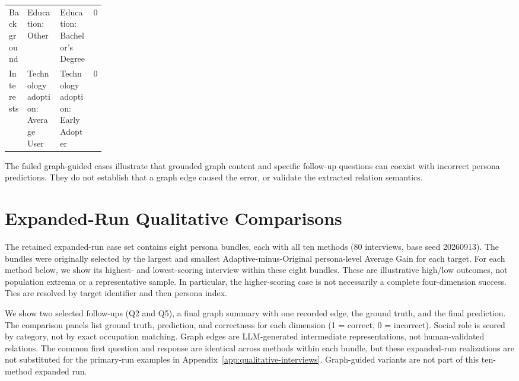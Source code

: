 \documentclass{ieeeaccess}
\begin{document}
\begin{multicols*}{2}
\begin{minipage}{\linewidth}
\begin{tabularx}{\linewidth}{@{}p{0.19\linewidth}>{\raggedright\arraybackslash}X>{\raggedright\arraybackslash}Xr@{}}
Background & Education: Other & Education: Bachelor's Degree & 0 \\
\addlinespace[2pt]
Interests & Technology adoption: Average User & Technology adoption: Early Adopter & 0 \\
\bottomrule
\end{tabularx}\par
\endgroup
\end{minipage}\par\medskip
The failed graph-guided cases illustrate that grounded graph content and specific follow-up questions can coexist with incorrect persona predictions. They do not establish that a graph edge caused the error, or validate the extracted relation semantics.

\section{Expanded-Run Qualitative Comparisons}
\label{app:expanded-qualitative}
The retained expanded-run case set contains eight persona bundles, each with all ten
methods (80 interviews, base seed 20260913). The bundles were originally selected by the
largest and smallest Adaptive-minus-Original persona-level Average Gain for each target.
For each method below, we show its highest- and lowest-scoring interview within these
eight bundles. These are illustrative high/low outcomes, not population extrema or a
representative sample. In particular, the higher-scoring case is not necessarily a complete
four-dimension success. Ties are resolved by target identifier and then persona index.

We show two selected follow-ups (Q2 and Q5), a final graph summary with one recorded edge,
the ground truth, and the final prediction. The comparison panels list ground truth, prediction, and correctness for each
dimension (1 = correct, 0 = incorrect). Social role is scored by category, not by exact
occupation matching. Graph edges are LLM-generated intermediate
representations, not human-validated relations. The common first question and response are
identical across methods within each bundle, but these expanded-run realizations are
not substituted for the primary-run examples in Appendix~\ref{app:qualitative-interviews}.
Graph-guided variants are not part of this ten-method expanded run.


\end{multicols*}
\end{document}
